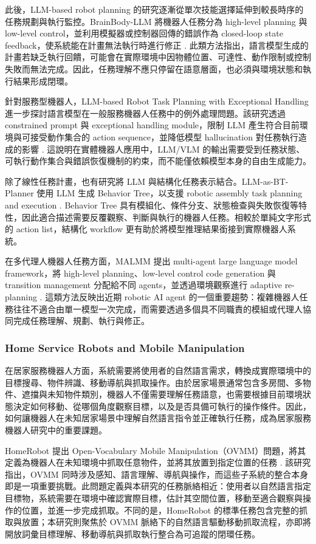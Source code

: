 \documentclass[12pt,a4paper]{article}
\begin{document}
此後，LLM-based robot planning 的研究逐漸從單次技能選擇延伸到較長時序的任務規劃與執行監控。BrainBody-LLM 將機器人任務分為 high-level planning 與 low-level control，並利用模擬器或控制器回傳的錯誤作為 closed-loop state feedback，使系統能在計畫無法執行時進行修正 \cite{bhat2024brainbody}. 此類方法指出，語言模型生成的計畫若缺乏執行回饋，可能會在實際環境中因物體位置、可達性、動作限制或控制失敗而無法完成。因此，任務理解不應只停留在語意層面，也必須與環境狀態和執行結果形成閉環。

針對服務型機器人，LLM-based Robot Task Planning with Exceptional Handling 進一步探討語言模型在一般服務機器人任務中的例外處理問題。該研究透過 constrained prompt 與 exceptional handling module，限制 LLM 產生符合目前環境與可接受動作集合的 action sequence，並降低模型 hallucination 對任務執行造成的影響 \cite{wang2024exception}. 這說明在實體機器人應用中，LLM/VLM 的輸出需要受到任務狀態、可執行動作集合與錯誤恢復機制的約束，而不能僅依賴模型本身的自由生成能力。

除了線性任務計畫，也有研究將 LLM 與結構化任務表示結合。LLM-as-BT-Planner 使用 LLM 生成 Behavior Tree，以支援 robotic assembly task planning and execution \cite{ao2024btplanner}. Behavior Tree 具有模組化、條件分支、狀態檢查與失敗恢復等特性，因此適合描述需要反覆觀察、判斷與執行的機器人任務。相較於單純文字形式的 action list，結構化 workflow 更有助於將模型推理結果銜接到實際機器人系統。

在多代理人機器人任務方面，MALMM 提出 multi-agent large language model framework，將 high-level planning、low-level control code generation 與 transition management 分配給不同 agents，並透過環境觀察進行 adaptive re-planning \cite{singh2024malmm}. 這類方法反映出近期 robotic AI agent 的一個重要趨勢：複雜機器人任務往往不適合由單一模型一次完成，而需要透過多個具不同職責的模組或代理人協同完成任務理解、規劃、執行與修正。

\subsubsection{Home Service Robots and Mobile Manipulation}

在居家服務機器人方面，系統需要將使用者的自然語言需求，轉換成實際環境中的目標搜尋、物件辨識、移動導航與抓取操作。由於居家場景通常包含多房間、多物件、遮擋與未知物件類別，機器人不僅需要理解任務語意，也需要根據目前環境狀態決定如何移動、從哪個角度觀察目標，以及是否具備可執行的操作條件。因此，如何讓機器人在未知居家場景中理解自然語言指令並正確執行任務，成為居家服務機器人研究中的重要課題。

HomeRobot 提出 Open-Vocabulary Mobile Manipulation（OVMM）問題，將其定義為機器人在未知環境中抓取任意物件，並將其放置到指定位置的任務 \cite{yenamandra2023homerobot}. 該研究指出，OVMM 同時涉及感知、語言理解、導航與操作，而這些子系統的整合本身即是一項重要挑戰。此問題定義與本研究的任務脈絡相近：使用者以自然語言指定目標物，系統需要在環境中確認實際目標，估計其空間位置，移動至適合觀察與操作的位置，並進一步完成抓取。不同的是，HomeRobot 的標準任務包含完整的抓取與放置；本研究則聚焦於 OVMM 脈絡下的自然語言驅動移動抓取流程，亦即將開放詞彙目標理解、移動導航與抓取執行整合為可追蹤的閉環任務。
\end{document}

